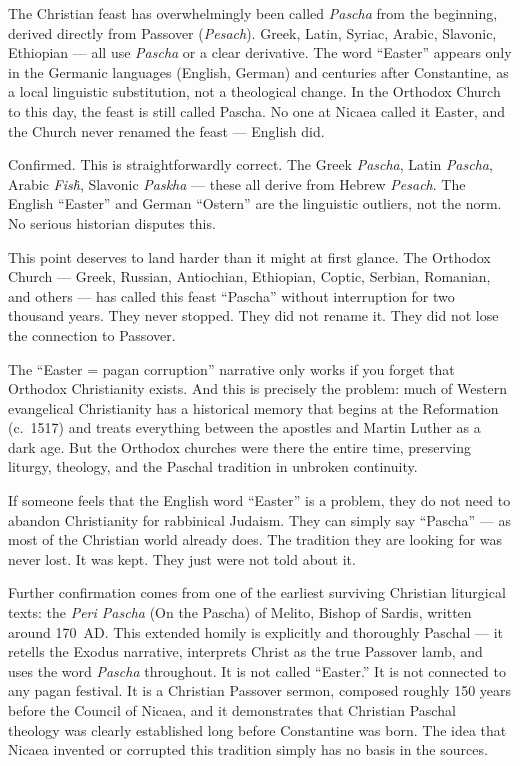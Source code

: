 \documentclass[10pt,twoside,openany]{book}
\begin{document}
The Christian feast has overwhelmingly been called \emph{Pascha} from the
beginning, derived directly from Passover (\emph{Pesach}). Greek, Latin,
Syriac, Arabic, Slavonic, Ethiopian --- all use \emph{Pascha} or a clear
derivative. The word ``Easter'' appears only in the Germanic languages
(English, German) and centuries after Constantine, as a local
linguistic substitution, not a theological change. In the Orthodox
Church to this day, the feast is still called Pascha. No one at Nicaea
called it Easter, and the Church never renamed the feast --- English did.

\begin{reviewerbox}
Confirmed. This is straightforwardly correct. The
Greek \emph{Pascha}, Latin \emph{Pascha}, Arabic \emph{Fis\.{h}}, Slavonic
\emph{Paskha} --- these all derive from Hebrew \emph{Pesach}. The
English ``Easter'' and German ``Ostern'' are the linguistic
outliers, not the norm. No serious historian disputes
this.
\end{reviewerbox}

\begin{westernbox}
This point deserves to land harder than it might at
first glance. The Orthodox Church --- Greek, Russian,
Antiochian, Ethiopian, Coptic, Serbian, Romanian, and
others --- has called this feast ``Pascha'' without
interruption for two thousand years. They never stopped.
They did not rename it. They did not lose the
connection to Passover.

The ``Easter = pagan corruption'' narrative only works if
you forget that Orthodox Christianity exists. And this
is precisely the problem: much of Western evangelical
Christianity has a historical memory that begins at the
Reformation (c.\ 1517) and treats everything between the
apostles and Martin Luther as a dark age. But the
Orthodox churches were there the entire time, preserving
liturgy, theology, and the Paschal tradition in
unbroken continuity.

If someone feels that the English word ``Easter'' is a
problem, they do not need to abandon Christianity for
rabbinical Judaism. They can simply say ``Pascha'' --- as
most of the Christian world already does. The tradition
they are looking for was never lost. It was kept. They
just were not told about it.
\end{westernbox}

Further confirmation comes from one of the earliest surviving
Christian liturgical texts: the \emph{Peri Pascha} (On the Pascha) of
Melito, Bishop of Sardis, written around 170~AD. This extended homily
is explicitly and thoroughly Paschal --- it retells the Exodus
narrative, interprets Christ as the true Passover lamb, and uses the
word \emph{Pascha} throughout. It is not called ``Easter.'' It is not
connected to any pagan festival. It is a Christian Passover sermon,
composed roughly 150 years before the Council of Nicaea, and it
demonstrates that Christian Paschal theology was clearly established long
before Constantine was born. The idea that Nicaea invented or
corrupted this tradition simply has no basis in the sources.
\end{document}
